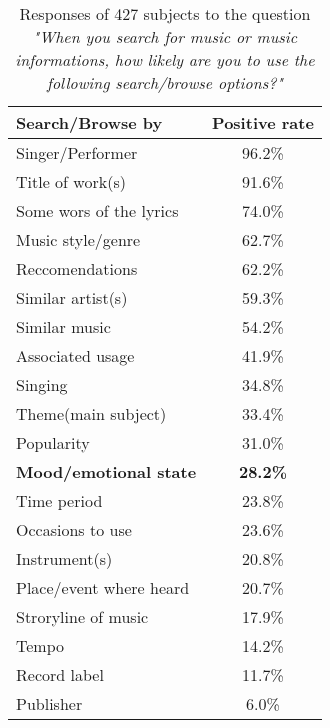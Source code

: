 \begin{table}[h!]
\centering
\begin{tabular}{|l | c|}
\hline
Search/Browse by & Positive rate\\ [0.5ex] 
\hline\hline Singer/Performer 			&		96.2\%	\\ 
\hline	Title of work(s) 					& 		91.6\%	\\ 
\hline	Some wors of the lyrics 	& 		74.0\% 	\\
\hline	Music style/genre 				&		62.7\%	\\
\hline	Reccomendations 				&		62.2\%	\\
\hline	Similar artist(s)					&		59.3\%	\\
\hline	Similar music 					&		54.2\%	\\
\hline	Associated usage				&		41.9\% 	\\
\hline	Singing								&		34.8\% 	\\
\hline	Theme(main subject)			&		33.4\% 	\\
\hline	Popularity							&		31.0\% 	\\
\hline	\textbf{Mood/emotional state	}	&		\textbf{28.2\%} 	\\
\hline	Time period						&		23.8\% 	\\
\hline	Occasions to use				&		23.6\% 	\\
\hline	Instrument(s)					&		20.8\% 	\\
\hline	Place/event where heard	&		20.7\% 	\\
\hline	Stroryline of music			&		17.9\% 	\\
\hline	Tempo								&		14.2\% 	\\
\hline	Record label						&		11.7\% 	\\
\hline	Publisher							&		6.0\% 	\\
\hline
\end{tabular}
\caption{Responses of 427 subjects to the question \textit{"When you search for music or music informations, how likely are you to use the following search/browse options?"}}
\label{table:browse_music}
\end{table}

